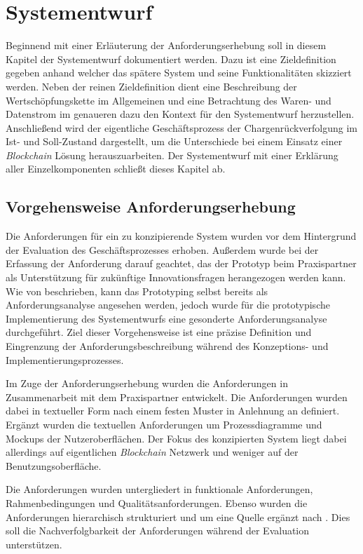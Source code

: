 \section{Systementwurf} \label{sec:system-design}

Beginnend mit einer Erläuterung der Anforderungserhebung soll in diesem Kapitel der Systementwurf dokumentiert werden. Dazu ist eine Zieldefinition gegeben anhand welcher das spätere System und seine Funktionalitäten skizziert werden. Neben der reinen Zieldefinition dient eine Beschreibung der Wertschöpfungskette im Allgemeinen und eine Betrachtung des Waren- und Datenstrom im genaueren dazu den Kontext für den Systementwurf herzustellen. Anschließend wird der eigentliche Geschäftsprozess der Chargenrückverfolgung im Ist- und Soll-Zustand dargestellt, um die Unterschiede bei einem Einsatz einer \textit{Blockchain} Lösung herauszuarbeiten. Der Systementwurf mit einer Erklärung aller Einzelkomponenten schließt dieses Kapitel ab.

\subsection{Vorgehensweise Anforderungserhebung}
Die Anforderungen für ein zu konzipierende System wurden vor dem Hintergrund der Evaluation des Geschäftsprozesses erhoben. Außerdem wurde bei der Erfassung der Anforderung darauf geachtet, das der Prototyp beim Praxispartner als Unterstützung für zukünftige Innovationsfragen herangezogen werden kann. Wie von \citet{Dick2017, HullElizabeth2011} beschrieben, kann das Prototyping selbst bereits als Anforderungsanalyse angesehen werden, jedoch wurde für die prototypische Implementierung des Systementwurfs eine gesonderte Anforderungsanalyse durchgeführt. Ziel dieser Vorgehensweise ist eine präzise Definition und Eingrenzung der Anforderungsbeschreibung während des Konzeptions- und Implementierungsprozesses.

Im Zuge der Anforderungserhebung wurden die Anforderungen in Zusammenarbeit mit dem Praxispartner entwickelt. Die Anforderungen wurden dabei in textueller Form nach einem festen Muster in Anlehnung an \citet{PohlKlaus2015} definiert. Ergänzt wurden die textuellen Anforderungen um Prozessdiagramme und Mockups der Nutzeroberflächen. Der Fokus des konzipierten System liegt dabei allerdings auf eigentlichen \textit{Blockchain} Netzwerk und weniger auf der Benutzungsoberfläche.

Die Anforderungen wurden untergliedert in funktionale Anforderungen, Rahmenbedingungen und Qualitätsanforderungen. Ebenso wurden die Anforderungen hierarchisch strukturiert und um eine Quelle ergänzt nach \citet{Koelsch2016}. Dies soll die Nachverfolgbarkeit der Anforderungen während der Evaluation unterstützen.

